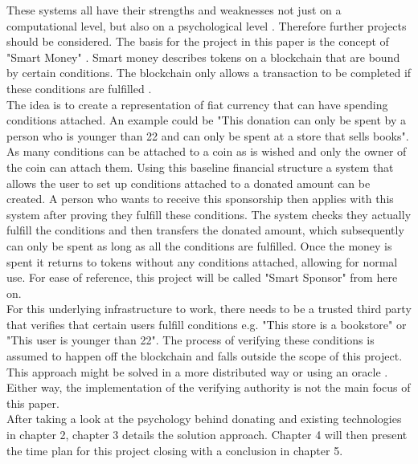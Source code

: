 These systems all have their strengths and weaknesses not just on a computational level, but also on a psychological level \cite{progDon}. Therefore further projects should be considered. The basis for the project in this paper is the concept of "Smart Money" \cite{weber}. Smart money describes tokens on a blockchain that are bound by certain conditions. The blockchain only allows a transaction to be completed if these conditions are fulfilled \cite{weber}. %
\\ 
The idea is to create a representation of fiat currency that can have spending conditions attached. An example could be "This donation can only be spent by a person who is younger than 22 and can only be spent at a store that sells books". As many conditions can be attached to a coin as is wished and only the owner of the coin can attach them. Using this baseline financial structure a system that allows the user to set up conditions attached to a donated amount can be created. A person who wants to receive this sponsorship then applies with this system after proving they fulfill these conditions. The system checks they actually fulfill the conditions and then transfers the donated amount, which subsequently can only be spent as long as all the conditions are fulfilled. Once the money is spent it returns to tokens without any conditions attached, allowing for normal use. For ease of reference, this project will be called "Smart Sponsor" from here on. \\
For this underlying infrastructure to work, there needs to be a trusted third party that verifies that certain users fulfill conditions e.g. "This store is a bookstore" or "This user is younger than 22". The process of verifying these conditions is assumed to happen off the blockchain and falls outside the scope of this project. This approach might be solved in a more distributed way or using an oracle \cite{pattern}. Either way, the implementation of the verifying authority is not the main focus of this paper.\\
After taking a look at the psychology behind donating and existing technologies in chapter 2, chapter 3 details the solution approach. Chapter 4 will then present the time plan for this project closing with a conclusion in chapter 5.